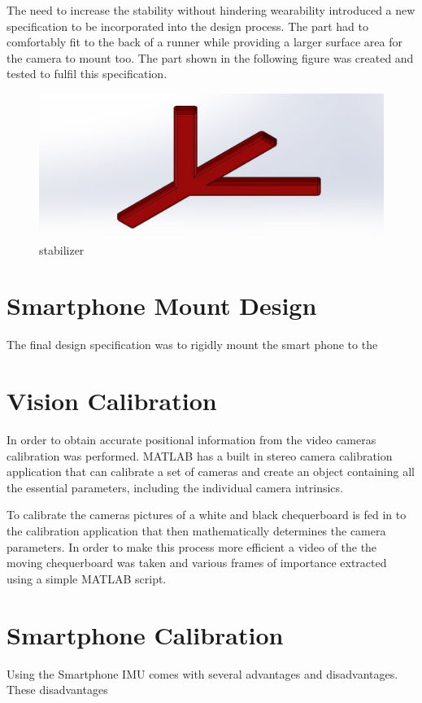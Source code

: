 The need to increase the stability without hindering wearability introduced a new specification to be incorporated into the design process. The part had to comfortably fit to the back of a runner while providing a larger surface area for the camera to mount too. The part shown in the following figure was created and tested to fulfil this specification.

\begin{figure}[!ht] 
\captionsetup{width=\linewidth, font=small}  
\includegraphics[width=\linewidth]{figures/stabil.JPG}
\caption{stabilizer}
\label{fig:stabil}
\end{figure}


\section{Smartphone Mount Design}
The final design specification was to rigidly mount the smart phone to the 


\section{Vision Calibration}
In order to obtain accurate positional information from the video cameras calibration was performed. MATLAB has a built in stereo camera calibration application that can calibrate a set of cameras and create an object containing all the essential parameters, including the individual camera intrinsics.

To calibrate the cameras pictures of a white and black chequerboard is fed in to the calibration application that then mathematically determines the camera parameters. In order to make this process more efficient a video of the the moving chequerboard was taken and various frames of importance extracted using a simple MATLAB script. 

\section{Smartphone Calibration}
Using the Smartphone IMU comes with several advantages and disadvantages. These disadvantages 

